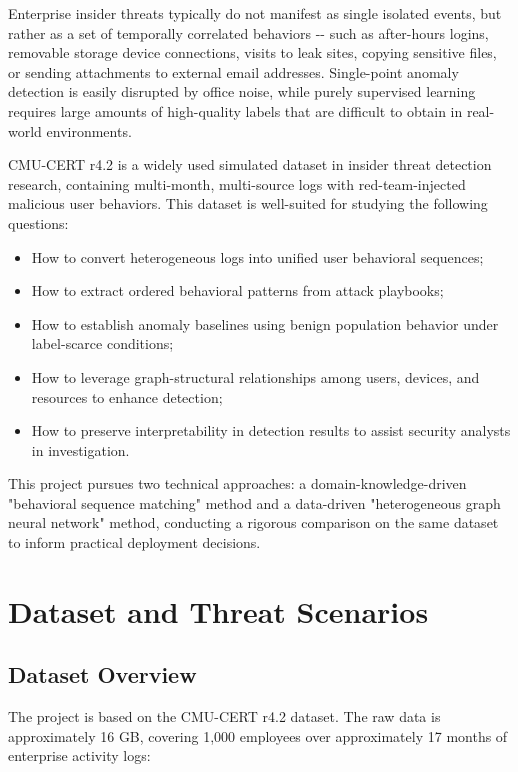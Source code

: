 \documentclass[
  a4paper,
  11pt]{article}
\providecommand{\tightlist}{%
  \setlength{\itemsep}{0pt}\setlength{\parskip}{0pt}}
\begin{document}
Enterprise insider threats typically do not manifest as single isolated
events, but rather as a set of temporally correlated behaviors -\/- such
as after-hours logins, removable storage device connections, visits to
leak sites, copying sensitive files, or sending attachments to external
email addresses. Single-point anomaly detection is easily disrupted by
office noise, while purely supervised learning requires large amounts of
high-quality labels that are difficult to obtain in real-world
environments.

CMU-CERT r4.2 is a widely used simulated dataset in insider threat
detection research, containing multi-month, multi-source logs with
red-team-injected malicious user behaviors. This dataset is well-suited
for studying the following questions:

\begin{itemize}
\tightlist
\item
  How to convert heterogeneous logs into unified user behavioral
  sequences;
\item
  How to extract ordered behavioral patterns from attack playbooks;
\item
  How to establish anomaly baselines using benign population behavior
  under label-scarce conditions;
\item
  How to leverage graph-structural relationships among users, devices,
  and resources to enhance detection;
\item
  How to preserve interpretability in detection results to assist
  security analysts in investigation.
\end{itemize}

This project pursues two technical approaches: a domain-knowledge-driven
"behavioral sequence matching" method and a data-driven "heterogeneous
graph neural network" method, conducting a rigorous comparison on the
same dataset to inform practical deployment decisions.

\section{Dataset and Threat
Scenarios}\label{dataset-and-threat-scenarios}

\subsection{Dataset Overview}\label{dataset-overview}

The project is based on the CMU-CERT r4.2 dataset. The raw data is
approximately 16 GB, covering 1,000 employees over approximately 17
months of enterprise activity logs:
\end{document}
